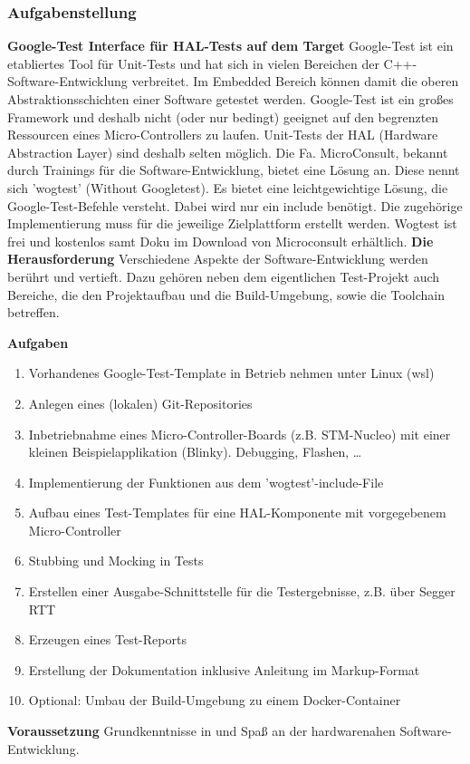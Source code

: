 \documentclass[12pt,a4paper]{article}
\begin{document}
\newpage
\subsubsection{Aufgabenstellung}
\textbf{Google-Test Interface für HAL-Tests auf dem Target}
\newline
Google-Test ist ein etabliertes Tool für Unit-Tests und hat sich in vielen Bereichen der C++-Software-Entwicklung verbreitet.
Im Embedded Bereich können damit die oberen Abstraktionsschichten einer Software getestet werden.
Google-Test ist ein großes Framework und deshalb nicht (oder nur bedingt) geeignet auf den begrenzten Ressourcen eines Micro-Controllers zu laufen.
Unit-Tests der HAL (Hardware Abstraction Layer) sind deshalb selten möglich.
Die Fa. MicroConsult, bekannt durch Trainings für die Software-Entwicklung, bietet eine Lösung an.
Diese nennt sich 'wogtest' (Without Googletest).
Es bietet eine leichtgewichtige Lösung, die Google-Test-Befehle versteht.
Dabei wird nur ein include benötigt.
Die zugehörige Implementierung muss für die jeweilige Zielplattform erstellt werden.
Wogtest ist frei und kostenlos samt Doku im Download von Microconsult erhältlich.
\newline\newline
\textbf{Die Herausforderung}
\newline
Verschiedene Aspekte der Software-Entwicklung werden berührt und vertieft.
Dazu gehören neben dem eigentlichen Test-Projekt auch Bereiche, die den Projektaufbau und die Build-Umgebung, sowie die Toolchain betreffen.
\newline

\textbf{Aufgaben}
\begin{enumerate}
  \item Vorhandenes Google-Test-Template in Betrieb nehmen unter Linux (wsl)
  \item Anlegen eines (lokalen) Git-Repositories
  \item Inbetriebnahme eines Micro-Controller-Boards (z.B. STM-Nucleo) mit einer kleinen Beispielapplikation (Blinky). Debugging, Flashen, …
  \item Implementierung der Funktionen aus dem 'wogtest'-include-File
  \item Aufbau eines Test-Templates für eine HAL-Komponente mit vorgegebenem Micro-Controller
  \item Stubbing und Mocking in Tests
  \item Erstellen einer Ausgabe-Schnittstelle für die Testergebnisse, z.B. über Segger RTT
  \item Erzeugen eines Test-Reports
  \item Erstellung der Dokumentation inklusive Anleitung im Markup-Format
  \item Optional: Umbau der Build-Umgebung zu einem Docker-Container\newline
\end{enumerate}
\textbf{Voraussetzung}
\newline
Grundkenntnisse in und Spaß an der hardwarenahen Software-Entwicklung.
\end{document}

